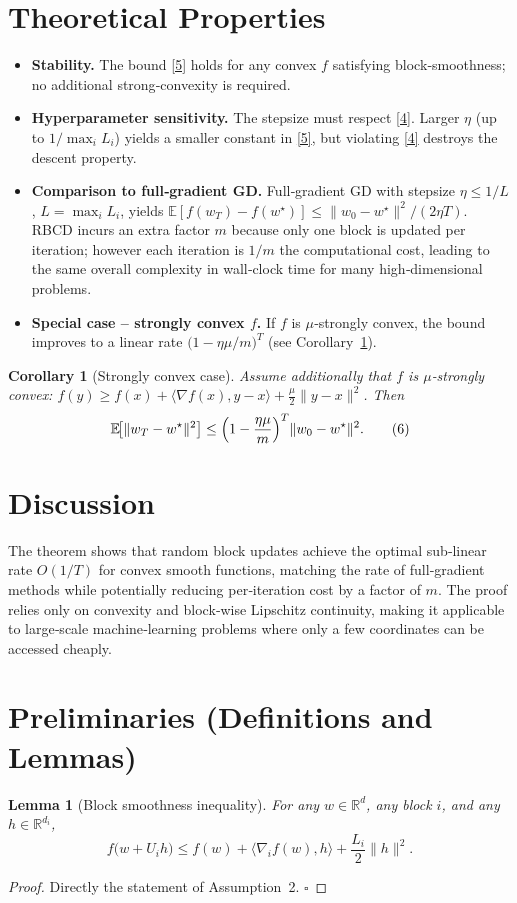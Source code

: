 \documentclass{article}
\newtheorem{lemma}{Lemma}
\newtheorem{corollary}{Corollary}
\newcommand{\E}{\mathbb{E}}
\newcommand{\R}{\mathbb{R}}
\begin{document}
\section*{Theoretical Properties}
\begin{itemize}[leftmargin=*]
\item \textbf{Stability.} The bound \eqref{5} holds for any convex
  $f$ satisfying block‑smoothness; no additional strong‑convexity
  is required.
\item \textbf{Hyperparameter sensitivity.}
  The stepsize must respect \eqref{4}. Larger $\eta$ (up to $1/\max_iL_i$)
  yields a smaller constant in \eqref{5}, but violating \eqref{4}
  destroys the descent property.
\item \textbf{Comparison to full‑gradient GD.}
  Full‑gradient GD with stepsize $\eta\le 1/L$, $L=\max_i L_i$, yields
  $\E[f(w_T)-f(w^\star)]\le \|w_0-w^\star\|^{2}/(2\eta T)$.
  RBCD incurs an extra factor $m$ because only one block is updated per
  iteration; however each iteration is $1/m$ the computational cost,
  leading to the same overall complexity in wall‑clock time for many
  high‑dimensional problems.
\item \textbf{Special case – strongly convex $f$.}
  If $f$ is $\mu$‑strongly convex, the bound improves to a linear rate
  $\bigl(1-\eta\mu/m\bigr)^{T}$ (see Corollary~\ref{cor:strong}).
\end{itemize}

\begin{corollary}[Strongly convex case]\label{cor:strong}
Assume additionally that $f$ is $\mu$‑strongly convex:
$f(y)\ge f(x)+\langle\nabla f(x),y-x\rangle+\frac{\mu}{2}\|y-x\|^{2}$.
Then
\[
\E\!\bigl[\|w_T-w^{\star}\|^{2}\bigr]\le
\Bigl(1-\frac{\eta\mu}{m}\Bigr)^{T}\|w_0-w^{\star}\|^{2}.
\tag{6}
\]
\end{corollary}

\section*{Discussion}
The theorem shows that random block updates achieve the optimal
sub‑linear rate $O(1/T)$ for convex smooth functions, matching the rate
of full‑gradient methods while potentially reducing per‑iteration cost
by a factor of $m$. The proof relies only on convexity and block‑wise
Lipschitz continuity, making it applicable to large‑scale machine‑learning
problems where only a few coordinates can be accessed cheaply.

\newpage
\section*{Preliminaries (Definitions and Lemmas)}
\begin{lemma}[Block smoothness inequality]\label{lem:smooth}
For any $w\in\R^{d}$, any block $i$, and any $h\in\R^{d_i}$,
\[
f\bigl(w+U_i h\bigr)\le
f(w)+\langle \nabla_i f(w),h\rangle+\frac{L_i}{2}\|h\|^{2}.
\tag{7}
\]
\end{lemma}
\begin{proof}
Directly the statement of Assumption~2. \hfill $\square$
\end{proof}
\end{document}

